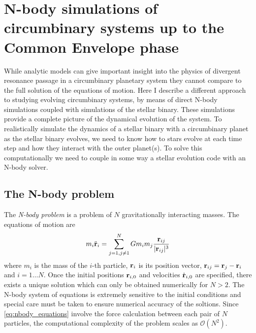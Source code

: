\documentclass[ twoside,openright,titlepage,numbers=noenddot,headinclude,%
                footinclude=true,cleardoublepage=empty,abstractoff, %
                BCOR=5mm,paper=a4,fontsize=11pt,%
                american,%
                ]{scrreprt}
\begin{document}
\frenchspacing
\raggedbottom

\pagestyle{plain}

\chapter{N-body simulations of circumbinary systems up to the Common Envelope phase}
\label{ch:NBODY_simulations}
While analytic models can give important insight into the physics 
of divergent resonance passage in a circumbinary planetary system
they cannot compare to the full solution of the equations of motion.
Here I describe a different approach to studying evolving
circumbinary systems, by means of direct
N-body simulations coupled with simulations of the stellar binary. 
These simulations provide a complete picture of the dynamical evolution
of the system. To realistically simulate the dynamics of a stellar binary
with a circumbinary planet as the stellar binary evolves, we need to know
how to stars evolve at each time step and how they interact with the outer
planet(s). To solve this computationally we need to couple in some way
a stellar evolution code with an N-body solver. 

\section{The N-body problem}
\label{sec:The N-body problem}
The \emph{N-body problem} is a problem of $N$ gravitationally interacting
masses. The equations of motion are
\begin{equation}
    m_i\ddot{\boldsymbol{\mathbf{r}}}_i=\sum_{j=1,j\neq 1}^NGm_im_j \frac{\boldsymbol{\mathbf{r}}_{ij}}
    {\lvert \boldsymbol{\mathbf{r}}_{ij}\rvert^3} 
    \label{eq:nbody_equations}
\end{equation}
where $m_i$ is the mass of the $i$-th particle, $\boldsymbol{\mathbf{r}}_i$ is its 
position vector, $\boldsymbol{\mathbf{r}}_{ij}=\boldsymbol{\mathbf{r}}_j-\boldsymbol{\mathbf{r}}_i$ and $i=1\dots N$.
Once the initial positions $\boldsymbol{\mathbf{r}}_{i,0}$ and velocities $\dot{\boldsymbol{\mathbf{r}}}_{i,0}$
are specified, there exists a unique solution which can only be obtained
numerically for $N>2$. The N-body system of equations is extremely sensitive
to the initial conditions and special care must be taken to ensure numerical
accuracy of the soltions. Since \cref{eq:nbody_equations} involve the force
calculation between each pair of $N$ particles, the computational complexity
of the problem scales as $\mathcal{O}(N^2)$.
\end{document}
